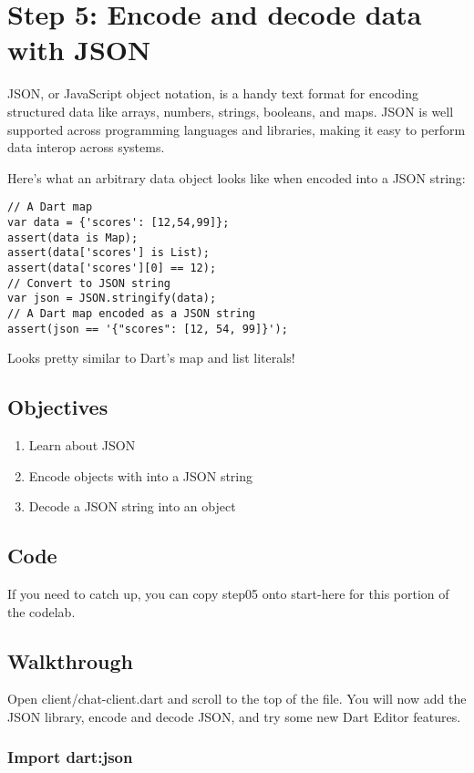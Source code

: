 \section{Step 5: Encode and decode data with JSON}

JSON, or JavaScript object notation, is a handy text format for encoding structured data like arrays, numbers, strings, booleans, and maps. JSON is well supported across programming languages and libraries, making it easy to perform data interop across systems.

Here’s what an arbitrary data object looks like when encoded into a JSON string:

\begin{verbatim}
// A Dart map
var data = {'scores': [12,54,99]};
assert(data is Map);
assert(data['scores'] is List);
assert(data['scores'][0] == 12);
// Convert to JSON string
var json = JSON.stringify(data);
// A Dart map encoded as a JSON string
assert(json == '{"scores": [12, 54, 99]}');
\end{verbatim}

Looks pretty similar to Dart’s map and list literals!

\subsection{Objectives}

\begin{enumerate}
\item Learn about JSON
\item Encode objects with into a JSON string
\item Decode a JSON string into an object
\end{enumerate}

\subsection{Code}

If you need to catch up, you can copy step05 onto start-here for this portion of the codelab.

\subsection{Walkthrough}

Open client/chat-client.dart and scroll to the top of the file. You will now add the JSON library, encode and decode JSON, and try some new Dart Editor features.

\subsubsection{Import dart:json}


